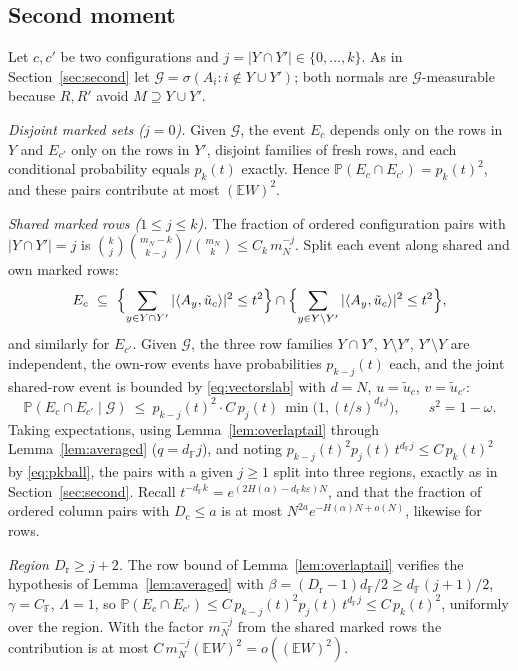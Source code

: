 \documentclass[11pt,reqno]{amsart}
\theoremstyle{plain}
\theoremstyle{definition}
\theoremstyle{remark}
\newcommand{\F}{\mathbb{F}}
\newcommand{\PP}{\mathbb{P}}
\newcommand{\EE}{\mathbb{E}}
\newcommand{\dF}{d_{\F}}
\begin{document}
\subsection{Second moment}
Let $c,c'$ be two configurations and $j=|Y\cap Y'|\in\{0,\dots,k\}$. As in
Section~\ref{sec:second} let $\mathcal G=\sigma(A_i:i\notin Y\cup Y')$; both normals are $\mathcal
G$-measurable because $R,R'$ avoid $M\supseteq Y\cup Y'$.

\emph{Disjoint marked sets ($j=0$).} Given $\mathcal G$, the event $E_c$ depends only on the rows
in $Y$ and $E_{c'}$ only on the rows in $Y'$, disjoint families of fresh rows, and each conditional
probability equals $p_k(t)$ exactly. Hence $\PP(E_c\cap E_{c'})=p_k(t)^2$, and these pairs
contribute at most $(\EE W)^2$.

\emph{Shared marked rows ($1\le j\le k$).} The fraction of ordered configuration pairs with
$|Y\cap Y'|=j$ is $\binom kj\binom{m_N-k}{k-j}/\binom{m_N}k\le C_k\,m_N^{-j}$. Split each event
along shared and own marked rows:
\[
  E_c\ \subseteq\ \Bigl\{\sum_{y\in Y\cap Y'}|\langle A_y,\tilde u_c\rangle|^2\le t^2\Bigr\}
  \cap\Bigl\{\sum_{y\in Y\setminus Y'}|\langle A_y,\tilde u_c\rangle|^2\le t^2\Bigr\},
\]
and similarly for $E_{c'}$. Given $\mathcal G$, the three row families $Y\cap Y'$, $Y\setminus Y'$,
$Y'\setminus Y$ are independent, the own-row events have probabilities $p_{k-j}(t)$ each, and the
joint shared-row event is bounded by \eqref{eq:vectorslab} with $d=N$, $u=\tilde u_c$,
$v=\tilde u_{c'}$:
\[
  \PP(E_c\cap E_{c'}\mid\mathcal G)\ \le\ p_{k-j}(t)^2\cdot C\,p_j(t)\,
  \min\!\bigl(1,(t/s)^{\dF j}\bigr),\qquad s^2=1-\omega .
\]
Taking expectations, using Lemma~\ref{lem:overlaptail} through Lemma~\ref{lem:averaged}
($q=\dF j$), and noting $p_{k-j}(t)^2p_j(t)\,t^{\dF j}\le C\,p_k(t)^2$ by \eqref{eq:pkball}, the
pairs with a given $j\ge1$ split into three regions, exactly as in Section~\ref{sec:second}. Recall
$t^{-\dF k}=e^{(2H(\alpha)-\dF k\varepsilon)N}$, and that the fraction of ordered column pairs with
$D_{\mathrm c}\le a$ is at most $N^{2a}e^{-H(\alpha)N+o(N)}$, likewise for rows.

\emph{Region $D_{\mathrm r}\ge j+2$.} The row bound of Lemma~\ref{lem:overlaptail} verifies the
hypothesis of Lemma~\ref{lem:averaged} with $\beta=(D_{\mathrm r}-1)\dF/2\ge\dF(j+1)/2$,
$\gamma=C_\F$, $\Lambda=1$, so $\PP(E_c\cap E_{c'})\le C\,p_{k-j}(t)^2p_j(t)\,t^{\dF j}\le
C\,p_k(t)^2$, uniformly over the region. With the factor $m_N^{-j}$ from the shared marked rows the
contribution is at most $C\,m_N^{-j}(\EE W)^2=o((\EE W)^2)$.
\end{document}
